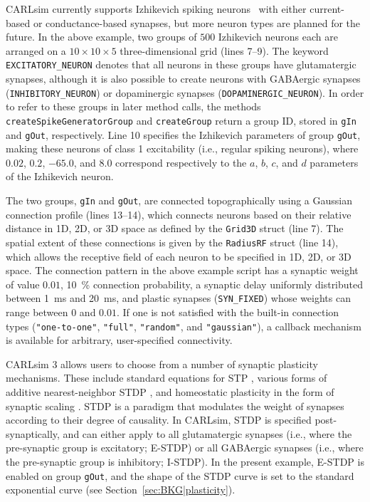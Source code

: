 CARLsim currently supports Izhikevich spiking neurons~\citep{Izhikevich2003} 
with either current-based or conductance-based synapses,
but more neuron types are planned for the future.
In the above example, two groups of $500$ Izhikevich neurons each
are arranged on a $10\times10\times5$ three-dimensional grid
(lines 7--9).
The keyword \texttt{EXCITATORY\_NEURON} denotes that all neurons
in these groups have glutamatergic synapses,
although it is also possible to create neurons with
GABAergic synapses (\texttt{INHIBITORY\_NEURON})
or dopaminergic synapses (\texttt{DOPAMINERGIC\_NEURON}).
In order to refer to these groups in
later method calls, the methods \texttt{createSpikeGeneratorGroup} and
\texttt{createGroup} return a group
ID, stored in \texttt{gIn} and \texttt{gOut}, respectively.
Line 10 specifies the Izhikevich parameters of group \texttt{gOut},
making these neurons of class 1 excitability (i.e., regular spiking neurons),
where $0.02$, $0.2$, $-65.0$, and $8.0$ correspond respectively to
the $a$, $b$, $c$, and $d$ parameters of the Izhikevich neuron.

The two groups, \texttt{gIn} and \texttt{gOut}, are connected topographically
using a Gaussian connection profile (lines 13--14), which connects 
neurons based on their relative distance in 1D, 2D, or 3D space as defined
by the \texttt{Grid3D} struct (line 7).
The spatial extent of these connections is given by the \texttt{RadiusRF}
struct (line 14), which allows the receptive field of each neuron to be
specified in 1D, 2D, or 3D space.
The connection pattern in the above example script
has a synaptic weight of value $0.01$,
\SI{10}{\percent}
connection probability, a synaptic delay uniformly distributed
between \SI{1}{\milli\second} and \SI{20}{\milli\second},
and plastic synapses (\texttt{SYN\_FIXED}) whose weights can range
between $0$ and $0.01$.
If one is not satisfied with the built-in connection types
(\texttt{"one-to-one"}, \texttt{"full"}, \texttt{"random"}, and 
\texttt{"gaussian"}), a callback mechanism is available for
arbitrary, user-specified connectivity.

CARLsim 3 allows users to choose from a number of
synaptic plasticity mechanisms. These include standard
equations for \ac{STP}
\citep{Tsodyks1998,Senn2001},
various forms of additive nearest-neighbor \ac{STDP}
\citep{IzhikevichDesai2003},
and homeostatic plasticity in the form of synaptic scaling
\citep{Carlson2013}.
\ac{STDP} is a paradigm that
modulates the weight of synapses according to their degree of
causality.
In CARLsim, \ac{STDP} is specified post-synaptically,
and can either apply to all glutamatergic synapses
(i.e., where the pre-synaptic group is excitatory; E-\ac{STDP})
or all GABAergic synapses
(i.e., where the pre-synaptic group is inhibitory; I-\ac{STDP}).
In the present example, E-\ac{STDP} is enabled on group \texttt{gOut},
and the shape of the \ac{STDP} curve is set to the standard exponential
curve (see Section~\ref{sec:BKG|plasticity}).

